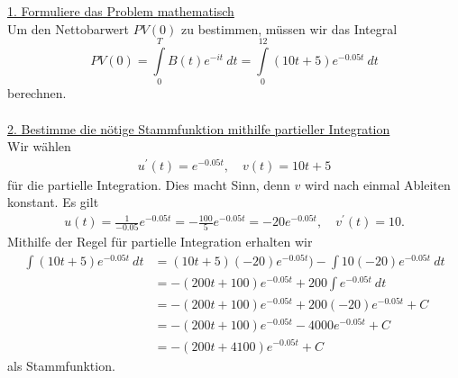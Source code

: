 \underline{1. Formuliere das Problem mathematisch}\\
Um den Nettobarwert $PV(0)$ zu bestimmen, müssen wir das Integral
\begin{equation*}
PV(0)
=
\int \limits_0^T B(t) e^{-i t} \ dt
=
\int \limits_0^{12} (10 t + 5) e^{-0.05 t} \ dt
\end{equation*}
berechnen.\\
\\
\underline{2. Bestimme die nötige Stammfunktion mithilfe partieller Integration}\\
Wir wählen
\begin{equation*}
\begin{split}
u^\prime(t)  =  e^{-0.05 t},  \quad
v(t)  = 10 t +5
\end{split}
\end{equation*}
für die partielle Integration.
Dies macht Sinn, denn $v$ wird nach einmal Ableiten konstant.
Es gilt 
\begin{equation*}
\begin{split}
u(t) = \frac{1}{-0.05} e^{-0.05t} 
=- \frac{100}{5} e^{-0.05t} = -20 e^{-0.05t}, \quad
v^\prime(t) = 10.
\end{split}
\end{equation*}
Mithilfe der Regel für partielle Integration erhalten wir
\begin{equation*}
\begin{split}
\int (10 t + 5) e^{-0.05 t} \ dt
&= 
(10t +5) (-20) e^{-0.05 t} ) - \int  10 (-20) e^{-0.05t} \ dt\\
&= -( 200 t + 100) e^{-0.05 t} + 200 \int e^{-0.05 t} \ dt\\
&=-(200 t + 100)  e^{-0.05t } + 200 (-20) e^{-0.05 t}  + C\\
&= -(200 t + 100) e^{-0.05 t } -4000 e^{-0.05t} + C \\
&= -(200 t +4100) e^{-0.05 t} + C
\end{split}
\end{equation*}
als Stammfunktion.\\

